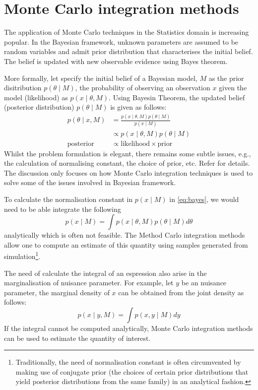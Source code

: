 
\chapter{Monte Carlo integration methods}
\label{ch:mcmethods}
The application of Monte Carlo techniques in the Statistics domain is increasing popular. In the Bayesian framework, unknown parameters are assumed to be random variables and admit prior distribution that characterises the initial belief. The belief is updated with new observable evidence using Bayes theorem.

More formally, let specify the initial belief of a Bayesian model, $M$ as the prior disitribution $p(\theta \mid M)$, the probability of observing an observation $x$ given the model (likelihood) as $p(x \mid \theta, M)$. Using Bayesin Theorem, the updated belief (posterior distribution) $p(\theta \mid M)$ is given as follows:
\begin{align}
  p(\theta \mid x , M) &= \frac{p(x \mid \theta , M) p(\theta \mid M)}{p(x \mid M)} \nonumber \\
                   &\propto p(x \mid \theta , M) p(\theta \mid M) \label{eq:bayes} \\
  \text{posterior} &\propto \text{likelihood} \times \text{prior}
\end{align}
Whilst the problem formulation is elegant, there remains some subtle issues, e.g., the calculation of normalising constant, the choice of prior, etc. Refer \cite{BD12} for details. The discussion only focuses on how Monte Carlo integration techniques is used to solve some of the issues involved in Bayesian framework.

To calculate the normalisation constant in $p(x \mid M)$ in \eqref{eq:bayes}, we would need to be able integrate the following
\begin{equation}
  p(x \mid M) = \int p (x \mid \theta, M)p(\theta \mid M) d\theta
\end{equation}
analytically which is often not feasible. The Method Carlo integration methods allow one to compute an estimate of this quantity using samples generated from simulation\footnote{Traditionally, the need of normalisation constant is often circumvented by making use of conjugate prior (the choices of certain prior distributions that yield posterior distributions from the same family) in an analytical fashion.}.

The need of calculate the integral of an espression also arise in the marginalisation of nuisance parameter. For example, let $y$ be an nuisance parameter, the marginal density of $x$ can be obtained from the joint density as follows:
\begin{equation}
  p(x \mid y, M) = \int p(x, y \mid M) dy
\end{equation}
If the integral cannot be computed analytically, Monte Carlo integration methods can be used to estimate the quantity of interest.

